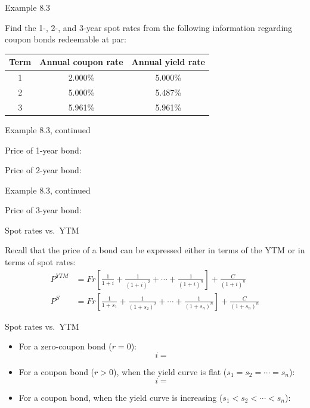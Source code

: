 \documentclass{beamer}
\begin{document}
\begin{frame}{Example 8.3}

Find the 1-, 2-, and 3-year spot rates from the following information regarding coupon bonds redeemable at par:

\begin{center}
\begin{tabular}{ccc}
\toprule
\textbf{Term} & \textbf{Annual coupon rate} & \textbf{Annual yield rate} \\
\midrule
1 & 2.000\% & 5.000\% \\
2 & 5.000\% & 5.487\% \\
3 & 5.961\% & 5.961\% \\
\bottomrule
\end{tabular}
\end{center}

\vfill
\end{frame}

\begin{frame}{Example 8.3, continued}

Price of 1-year bond:

\vspace{10em}
Price of 2-year bond:

\vfill
\end{frame}

\begin{frame}{Example 8.3, continued}

Price of 3-year bond:

\vfill
\end{frame}

\begin{frame}{Spot rates vs.\ YTM}

Recall that the price of a bond can be expressed either in terms of the YTM or in terms of spot rates:
\begin{align*}
P^{YTM} &= Fr\left[\frac{1}{1+i} + \frac{1}{(1+i)^2} + \cdots + \frac{1}{(1+i)^n}\right] + \frac{C}{(1+i)^n} \\[1ex]
P^{S} &= Fr\left[\frac{1}{1+s_1} + \frac{1}{(1+s_2)^2} + \cdots + \frac{1}{(1+s_n)^n}\right] + \frac{C}{(1+s_n)^n}
\end{align*}

\end{frame}

\begin{frame}{Spot rates vs.\ YTM}

\begin{itemize}
\item For a zero-coupon bond ($r = 0$):
\[
i =
\]
\item For a coupon bond ($r > 0$), when the yield curve is flat ($s_1 = s_2 = \cdots = s_n$):
\[
i =
\]
\item For a coupon bond, when the yield curve is increasing ($s_1 < s_2 < \cdots < s_n$):
\end{itemize}

\vfill
\end{frame}
\end{document}
